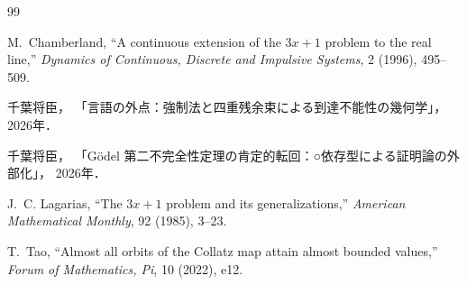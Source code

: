 \documentclass[a4paper,11pt]{ltjsarticle}
\theoremstyle{definition}
\theoremstyle{plain}
\newcommand{\1}{\mathbf{1}}
\begin{document}
\begin{thebibliography}{99}

M.~Chamberland,
``A continuous extension of the $3x+1$ problem to the real line,''
\emph{Dynamics of Continuous, Discrete and Impulsive Systems},
2 (1996), 495--509.

千葉将臣，
「言語の外点：強制法と四重残余束による到達不能性の幾何学」，2026年．

千葉将臣，
「Gödel 第二不完全性定理の肯定的転回：○依存型による証明論の外部化」，
2026年．

J.~C. Lagarias,
``The $3x+1$ problem and its generalizations,''
\emph{American Mathematical Monthly}, 92 (1985), 3--23.

T.~Tao,
``Almost all orbits of the Collatz map attain almost bounded values,''
\emph{Forum of Mathematics, Pi}, 10 (2022), e12.

\end{thebibliography}
\end{document}

